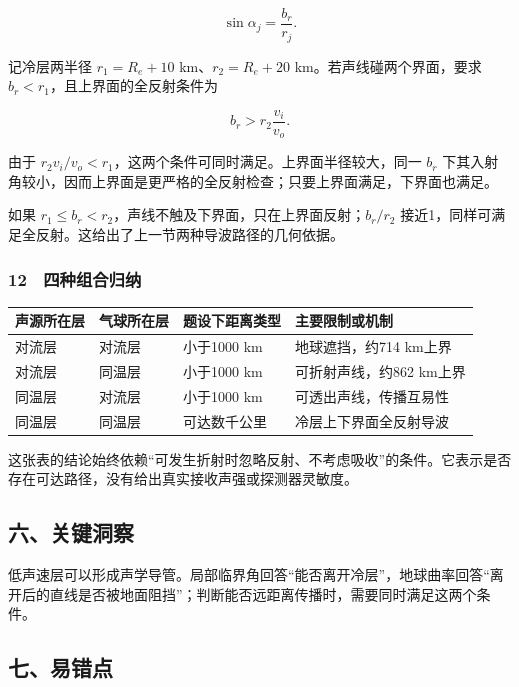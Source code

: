 \documentclass[12pt,a4paper,fontset=fandol]{ctexart}
\begin{document}
\[\sin\alpha_j=\frac{b_r}{r_j}.\]

记冷层两半径 \(r_1=R_e+10\) km、\(r_2=R_e+20\)
km。若声线碰两个界面，要求 \(b_r<r_1\)，且上界面的全反射条件为

\[b_r>r_2\frac{v_i}{v_o}.\]

由于 \(r_2v_i/v_o<r_1\)，这两个条件可同时满足。上界面半径较大，同一
\(b_r\)
下其入射角较小，因而上界面是更严格的全反射检查；只要上界面满足，下界面也满足。

如果 \(r_1\le b_r<r_2\)，声线不触及下界面，只在上界面反射；\(b_r/r_2\)
接近1，同样可满足全反射。这给出了上一节两种导波路径的几何依据。

\subsubsection{12　四种组合归纳}\label{ux56dbux79cdux7ec4ux5408ux5f52ux7eb3}

{\def\LTcaptype{table} %
\begin{longtable}[]{@{}llll@{}}
\toprule\noalign{}
声源所在层 & 气球所在层 & 题设下距离类型 & 主要限制或机制 \\
\midrule\noalign{}
\endhead
\bottomrule\noalign{}
\endlastfoot
对流层 & 对流层 & 小于1000 km & 地球遮挡，约714 km上界 \\
对流层 & 同温层 & 小于1000 km & 可折射声线，约862 km上界 \\
同温层 & 对流层 & 小于1000 km & 可透出声线，传播互易性 \\
同温层 & 同温层 & 可达数千公里 & 冷层上下界面全反射导波 \\
\end{longtable}
}

这张表的结论始终依赖``可发生折射时忽略反射、不考虑吸收''的条件。它表示是否存在可达路径，没有给出真实接收声强或探测器灵敏度。

\subsection{六、关键洞察}\label{ux516dux5173ux952eux6d1eux5bdf-6}

低声速层可以形成声学导管。局部临界角回答``能否离开冷层''，地球曲率回答``离开后的直线是否被地面阻挡''；判断能否远距离传播时，需要同时满足这两个条件。

\subsection{七、易错点}\label{ux4e03ux6613ux9519ux70b9-6}
\end{document}
